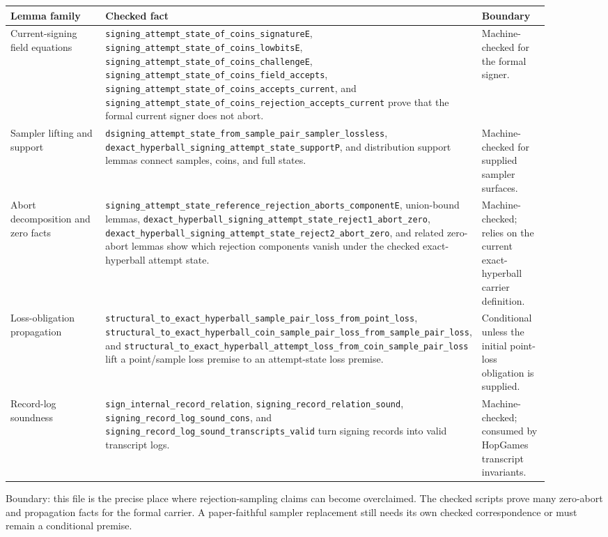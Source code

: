 \documentclass[11pt]{report}
\DeclareRobustCommand{\ec}[1]{\ifmmode\text{\nolinkurl{#1}}\else\nolinkurl{#1}\fi}
\theoremstyle{definition}
\theoremstyle{plain}
\begin{document}
\begin{longtable}{p{0.31\linewidth}p{0.42\linewidth}p{0.17\linewidth}}
\toprule
\textbf{Lemma family} & \textbf{Checked fact} & \textbf{Boundary} \\
\midrule
Current-signing field equations &
\ec{signing\_attempt\_state\_of\_coins\_signatureE},
\ec{signing\_attempt\_state\_of\_coins\_lowbitsE},
\ec{signing\_attempt\_state\_of\_coins\_challengeE},
\ec{signing\_attempt\_state\_of\_coins\_field\_accepts},
\ec{signing\_attempt\_state\_of\_coins\_accepts\_current}, and
\ec{signing\_attempt\_state\_of\_coins\_rejection\_accepts\_current} prove
that the formal current signer does not abort. &
Machine-checked for the formal signer. \\
\midrule
Sampler lifting and support &
\ec{dsigning\_attempt\_state\_from\_sample\_pair\_sampler\_lossless},
\ec{dexact\_hyperball\_signing\_attempt\_state\_supportP}, and distribution
support lemmas connect samples, coins, and full states. &
Machine-checked for supplied sampler surfaces. \\
\midrule
Abort decomposition and zero facts &
\ec{signing\_attempt\_state\_reference\_rejection\_aborts\_componentE},
union-bound lemmas, \ec{dexact\_hyperball\_signing\_attempt\_state\_reject1\_abort\_zero},
\ec{dexact\_hyperball\_signing\_attempt\_state\_reject2\_abort\_zero}, and
related zero-abort lemmas show which rejection components vanish under the
checked exact-hyperball attempt state. &
Machine-checked; relies on the current exact-hyperball carrier definition. \\
\midrule
Loss-obligation propagation &
\ec{structural\_to\_exact\_hyperball\_sample\_pair\_loss\_from\_point\_loss},
\ec{structural\_to\_exact\_hyperball\_coin\_sample\_pair\_loss\_from\_sample\_pair\_loss},
and \ec{structural\_to\_exact\_hyperball\_attempt\_loss\_from\_coin\_sample\_pair\_loss}
lift a point/sample loss premise to an attempt-state loss premise. &
Conditional unless the initial point-loss obligation is supplied. \\
\midrule
Record-log soundness &
\ec{sign\_internal\_record\_relation},
\ec{signing\_record\_relation\_sound},
\ec{signing\_record\_log\_sound\_cons}, and
\ec{signing\_record\_log\_sound\_transcripts\_valid} turn signing records into
valid transcript logs. &
Machine-checked; consumed by HopGames transcript invariants. \\
\bottomrule
\end{longtable}

Boundary: this file is the precise place where rejection-sampling claims can
become overclaimed.  The checked scripts prove many zero-abort and propagation
facts for the formal carrier.  A paper-faithful sampler replacement still
needs its own checked correspondence or must remain a conditional premise.
\end{document}
